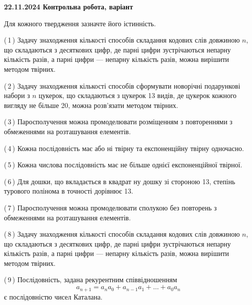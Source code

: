 \documentclass[12pt, ukrainian]{article}
\begin{document}
\begin {large}
\begin {large}
\begin {large}
\begin {large}
\begin {large}
\begin {large}
\begin {large}
\begin {large}
\begin {large}
\begin {large}
\begin {large}
\begin {large}
\begin {large}
\begin {large}
\begin {large}
\begin {large}
\begin {large}
\begin {large}
\begin {large}
\begin {large}
\begin {large}
\begin {large}
\begin {large}
\begin {large}
\begin {large}
\begin {large}

\textbf{22.11.2024 Контрольна робота, варіант  }\par


{
Для кожного твердження зазначте його істинність.\par

\vspace{2mm}

(\,1\,) Задачу знаходження кількості способів складання кодових слів довжиною $n$, що складаються з десяткових цифр, де парні цифри зустрічаються непарну кількість разів, а парні цифри — непарну кількість разів, можна вирішити методом твірних.%



(\,2\,) Задачу знаходження кількості способів сформувати новорічні подарункові набори з $n$ цукерок, що складаються з цукерок 13 видів, де цукерок кожного вигляду не більше 20, можна розв’язати методом твірних.%



(\,3\,) Паросполучення можна промоделювати розміщенням з повтореннями з обмеженнями на розташування елементів.%



(\,4\,) Кожна послідовність має або ні твірну та експоненційну твірну одночасно.%



(\,5\,) Кожна числова послідовність має не більше однієї  експоненційної твірної.%



(\,6\,) Для дошки, що вкладається в квадрат ну дошку зі стороною 13, степінь турового полінома в точності дорівнює 13.%



(\,7\,) Паросполучення можна промоделювати сполукою без повторень з обмеженнями на розташування елементів.%



(\,8\,) Задачу знаходження кількості способів складання кодових слів довжиною $n$, що складаються з десяткових цифр, де парні цифри зустрічаються непарну кількість разів, а парні цифри — непарну кількість разів, можна вирішити методом твірних.%



(\,9\,) Послідовність, задана рекурентним співвідношенням $$a_{n+1}=a_{n}a_{0}+a_{n-1}a_{1}+\ldots+a_0a_{n}$$ є послідовністю чисел Каталана.%



}
\end{large}
\end{large}
\end{large}
\end{large}
\end{large}
\end{large}
\end{large}
\end{large}
\end{large}
\end{large}
\end{large}
\end{large}
\end{large}
\end{large}
\end{large}
\end{large}
\end{large}
\end{large}
\end{large}
\end{large}
\end{large}
\end{large}
\end{large}
\end{large}
\end{large}
\end{large}
\end{document}
